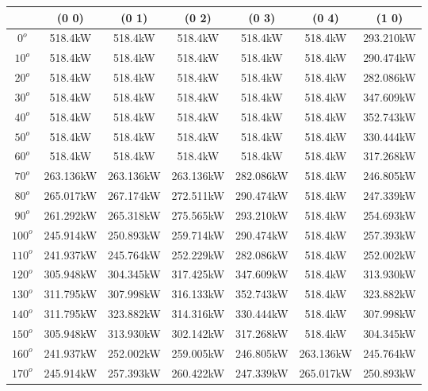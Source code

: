         \singlespacing
        \begin{table}[H]
        	\centering
        	\begin{tabular}{|c|c|c|c|c|c|c|} \hline
        			& (0 0)		& (0 1)		& (0 2)		& (0 3)		& (0 4)		& (1 0)		\\ \hline
		$0^o$	& 518.4kW	& 518.4kW	& 518.4kW	& 518.4kW	& 518.4kW	& 293.210kW	\\ \hline
		$10^o$	& 518.4kW	& 518.4kW	& 518.4kW	& 518.4kW	& 518.4kW	& 290.474kW	\\ \hline
		$20^o$	& 518.4kW	& 518.4kW	& 518.4kW	& 518.4kW	& 518.4kW	& 282.086kW	\\ \hline
		$30^o$	& 518.4kW	& 518.4kW	& 518.4kW	& 518.4kW	& 518.4kW	& 347.609kW	\\ \hline
		$40^o$	& 518.4kW	& 518.4kW	& 518.4kW	& 518.4kW	& 518.4kW	& 352.743kW	\\ \hline
		$50^o$	& 518.4kW	& 518.4kW	& 518.4kW	& 518.4kW	& 518.4kW	& 330.444kW	\\ \hline
		$60^o$	& 518.4kW	& 518.4kW	& 518.4kW	& 518.4kW	& 518.4kW	& 317.268kW	\\ \hline
		$70^o$	& 263.136kW	& 263.136kW	& 263.136kW	& 282.086kW	& 518.4kW	& 246.805kW	\\ \hline
		$80^o$	& 265.017kW	& 267.174kW	& 272.511kW	& 290.474kW	& 518.4kW	& 247.339kW	\\ \hline
		$90^o$	& 261.292kW	& 265.318kW	& 275.565kW	& 293.210kW	& 518.4kW	& 254.693kW	\\ \hline
		$100^o$	& 245.914kW	& 250.893kW	& 259.714kW	& 290.474kW	& 518.4kW	& 257.393kW	\\ \hline
		$110^o$	& 241.937kW	& 245.764kW	& 252.229kW	& 282.086kW	& 518.4kW	& 252.002kW	\\ \hline
		$120^o$	& 305.948kW	& 304.345kW	& 317.425kW	& 347.609kW	& 518.4kW	& 313.930kW	\\ \hline
		$130^o$	& 311.795kW	& 307.998kW	& 316.133kW	& 352.743kW	& 518.4kW	& 323.882kW	\\ \hline
		$140^o$	& 311.795kW	& 323.882kW	& 314.316kW	& 330.444kW	& 518.4kW	& 307.998kW	\\ \hline
		$150^o$	& 305.948kW	& 313.930kW	& 302.142kW	& 317.268kW	& 518.4kW	& 304.345kW	\\ \hline
		$160^o$	& 241.937kW	& 252.002kW	& 259.005kW	& 246.805kW	& 263.136kW	& 245.764kW	\\ \hline
		$170^o$	& 245.914kW	& 257.393kW	& 260.422kW	& 247.339kW	& 265.017kW	& 250.893kW	\\ \hline

\end{tabular}
\end{table}
